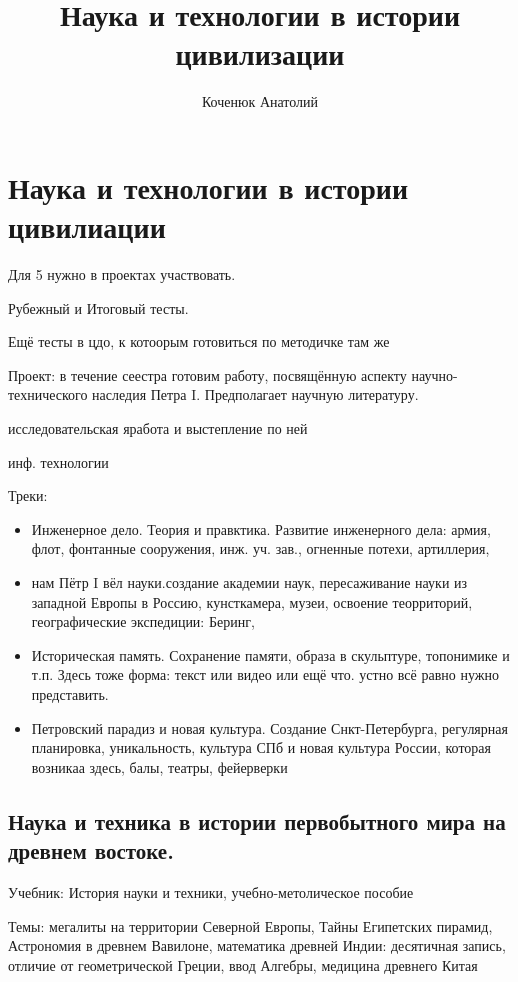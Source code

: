 \documentclass{book}
\author{Коченюк Анатолий}
\title{Наука и технологии в истории цивилизации}
\theoremstyle{definition}
\begin{document}
    \maketitle
    
    \chapter{Наука и технологии в истории цивилиации}

    Для 5 нужно в проектах участвовать.

    Рубежный и Итоговый тесты. 

    Ещё тесты в цдо, к котоорым готовиться по методичке там же

    Проект: в течение сеестра готовим работу, посвящённую аспекту научно-технического наследия Петра I. Предполагает научную литературу.

    исследовательская яработа и выстепление по ней

    инф. технологии


    Треки:
    \begin{itemize}
        \item Инженерное дело. Теория и правктика. Развитие инженерного дела: армия, флот, фонтанные сооружения, инж. уч. зав., огненные потехи, артиллерия, 
        \item нам Пётр I вёл науки.создание академии наук, пересаживание науки из западной Европы в Россию, кунсткамера, музеи, освоение теорриторий, географические экспедиции: Беринг, 
    \item Историческая память. Сохранение памяти, образа в скульптуре, топонимике и т.п. Здесь тоже форма: текст или видео или ещё что. устно всё равно нужно представить.
    \item Петровский парадиз и новая культура. Создание Снкт-Петербурга, регулярная планировка, уникальность, культура СПб и новая культура России, которая возникаа здесь, балы, театры, фейерверки
    \end{itemize}

    \section{Наука и техника в истории первобытного мира на древнем востоке.}

    Учебник: История науки и техники, учебно-метолическое пособие 

    Темы: мегалиты на территории Северной Европы, Тайны Египетских пирамид, Астрономия в древнем Вавилоне, математика древней Индии: десятичная запись, отличие от геометрической Греции, ввод Алгебры, медицина древнего Китая
\end{document}
